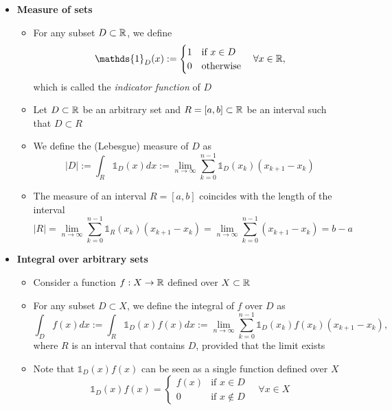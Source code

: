 \documentclass[12pt,a4paper]{article}
\begin{document}
\begin{itemize}
\item \textbf{Measure of sets}
  \begin{itemize}
  \item For any subset $D\subset \mathbb{R}$, we define
    \begin{equation}\nonumber%
      \mathds{1}_{D}(x) :=
      \begin{cases}
        1 & \text{if $x\in D$} \\
        0 & \text{otherwise} \\
      \end{cases}
      \quad \forall x \in \R,
    \end{equation}
    which is called the \emph{indicator function} of $D$
  \item Let $D\subset \mathbb{R}$ be an arbitrary set and $R=[a,b]\subset \mathbb{R}$ be an interval such that $D\subset R$
  \item We define the (Lebesgue) measure of $D$ as
    \begin{equation}\nonumber%
      |D|:=\int_{R}\mathds{1}_{D}(x)dx
      := \lim_{n\to\infty}\sum_{k=0}^{n-1}\mathds{1}_{D}(x_{k})(x_{k+1}-x_{k})
    \end{equation}
  \item The measure of an interval $R=[a,b]$ coincides with the length of the interval
    \begin{equation}\nonumber%
      |R|
      = \lim_{n\to\infty}\sum_{k=0}^{n-1}\mathds{1}_{R}(x_{k})(x_{k+1}-x_{k})
      = \lim_{n\to\infty}\sum_{k=0}^{n-1}(x_{k+1}-x_{k})
      = b-a
    \end{equation}
  \end{itemize}

\item \textbf{Integral over arbitrary sets}
  \begin{itemize}
  \item Consider a function $f:X \to \mathbb{R}$ defined over $X\subset \mathbb{R}$
  \item For any subset $D\subset X$, 
    we define the integral of $f$ over $D$ as
    \begin{equation}\nonumber%
      \int_{D}f(x)dx := \int_{R}\mathds{1}_{D}(x)f(x)dx := \lim_{n\to \infty}\sum_{k=0}^{n-1}\mathds{1}_{D}(x_{k})f(x_{k})(x_{k+1}-x_{k}),
    \end{equation}
    where $R$ is an interval that contains $D$, provided that the limit exists
  \item Note that $\mathds{1}_{D}(x)f(x)$ can be seen as a single function defined over $X$
    \begin{equation}\nonumber%
      \mathds{1}_{D}(x)f(x) =
      \begin{cases}
        f(x) & \text{if $x\in D$} \\
        0 & \text{if $x\notin D$}
      \end{cases}
      \quad \forall x\in X
     \end{equation}
  \end{itemize}

\end{itemize}
\end{document}
